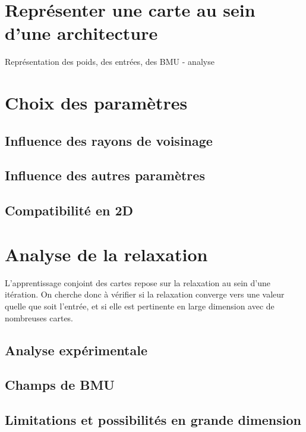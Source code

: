 \section{Représenter une carte au sein d'une architecture}

Représentation des poids, des entrées, des BMU - analyse




\section{Choix des paramètres}

\subsection{Influence des rayons de voisinage}

\subsection{Influence des autres paramètres}

\subsection{Compatibilité en 2D}

\section{Analyse de la relaxation}

L'apprentissage conjoint des cartes repose sur la relaxation au sein d'une itération. On cherche donc à vérifier si la relaxation converge vers une valeur quelle que soit l'entrée, et si elle est pertinente en large dimension avec de nombreuses cartes.

\subsection{Analyse expérimentale}

\subsection{Champs de BMU}

\subsection{Limitations et possibilités en grande dimension}

